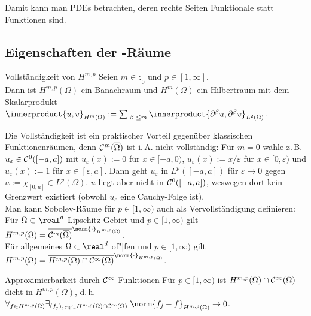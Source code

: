 \begin{Bem}
    Damit kann man PDEs betrachten, deren rechte Seiten Funktionale statt Funktionen sind.
\end{Bem}

\pagebreak

\subsection{%
    Eigenschaften der -Räume%
}

\begin{Satz}{Vollständigkeit von $H^{m,p}$}
    Seien $m \in \natural_0$ und $p \in [1, \infty]$.\\
    Dann ist $H^{m,p}(\Omega)$ ein Banachraum und
    $H^m(\Omega)$ ein Hilbertraum mit dem Skalarprodukt\\
    $\innerproduct{u, v}_{H^m(\Omega)} :=
    \sum_{|\beta| \le m} \innerproduct{\partial^\beta u, \partial^\beta v}_{L^2(\Omega)}$.
\end{Satz}

\begin{Bem}
    Die Vollständigkeit ist ein praktischer Vorteil gegenüber klassischen Funktionenräumen,
    denn $\mathcal{C}^m(\overline{\Omega})$ ist i.\,A. nicht vollständig:
    Für $m = 0$ wähle z.\,B. $u_\varepsilon \in \mathcal{C}^0([-a, a])$ mit
    $u_\varepsilon(x) := 0$ für $x \in [-a, 0)$,
    $u_\varepsilon(x) := x/\varepsilon$ für $x \in [0, \varepsilon)$ und
    $u_\varepsilon(x) := 1$ für $x \in [\varepsilon, a]$.
    Dann geht $u_\varepsilon$ in $L^p([-a,a])$ für $\varepsilon \to 0$
    gegen $u := \chi_{[0,a]} \in L^p(\Omega)$.
    $u$ liegt aber nicht in $\mathcal{C}^0([-a,a])$, weswegen dort kein Grenzwert existiert
    (obwohl $u_\varepsilon$ eine Cauchy-Folge ist).\\
    Man kann Sobolev-Räume für $p \in [1, \infty)$ auch als Vervollständigung definieren:\\
    Für $\Omega \subset \real^d$ Lipschitz-Gebiet und $p \in [1, \infty)$ gilt
    $H^{m,p}(\Omega) = \overline{\C^m(\overline{\Omega})}^{\norm{\cdot}_{H^{m,p}(\Omega)}}$.\\
    Für allgemeines $\Omega \subset \real^d$ of"|fen und $p \in [1, \infty)$ gilt
    $H^{m,p}(\Omega) = \overline{H^{m,p}(\Omega) \cap \C^\infty(\Omega)}^
    {\norm{\cdot}_{H^{m,p}(\Omega)}}$.
\end{Bem}

\linie

\begin{Satz}{Approximierbarkeit durch $\mathcal{C}^\infty$-Funktionen}
    Für $p \in [1, \infty)$ ist $H^{m,p}(\Omega) \cap \mathcal{C}^\infty(\Omega)$ dicht in
    $H^{m,p}(\Omega)$, d.\,h.
    $\forall_{f \in H^{m,p}(\Omega)}
    \exists_{(f_j)_{j \in \natural} \subset H^{m,p}(\Omega) \cap \C^\infty(\Omega)}\;
    \norm{f_j - f}_{H^{m,p}(\Omega)} \to 0$.
\end{Satz}

